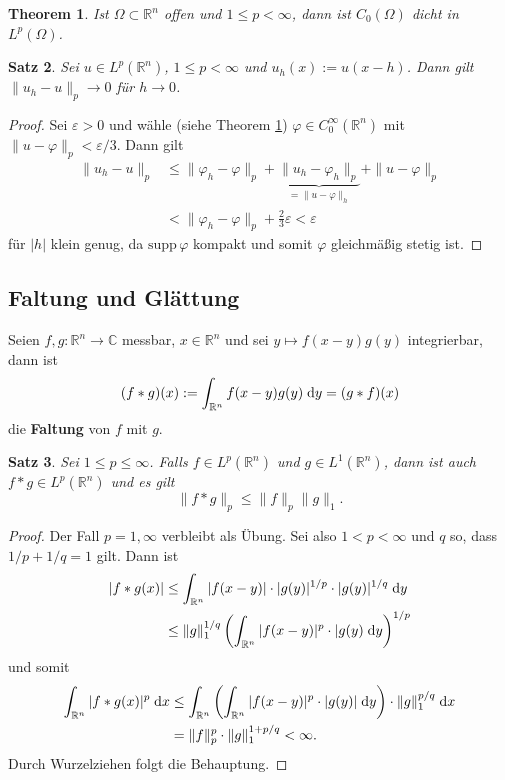 \documentclass[
paper=a4,
bibtotocnumbered,
liststotocnumbered,
tablecaptionabove,
pointlessnumbers,
twoside,
openright,
10pt
]
{report}
\newcommand{\supp}{\mathrm{supp}\,}
\let\phi\varphi
\let\epsilon\varepsilon
\newtheorem{thm}{Theorem}[chapter]
\newtheorem{satz}[thm]{Satz}
\theoremstyle{definition}
\numberwithin{equation}{chapter}
\begin{document}
\begin{thm}\label{thm1}
Ist $\Omega\subset\mathbb{R}^n$ offen und $1\leq p<\infty$, dann ist $C_0(\Omega)$ dicht in $L^p(\Omega)$.
\end{thm}

\begin{satz}\label{satz2}
Sei $u\in L^p(\mathbb{R}^n)$, $1\leq p<\infty$ und $u_h(x):= u(x-h)$. Dann gilt $\|u_h-u\|_p\rightarrow 0$ für $h\rightarrow 0$.
\end{satz}
\begin{proof}
Sei $\epsilon >0$ und wähle (siehe Theorem \ref{thm1}) $\phi\in C_0^\infty(\mathbb{R}^n)$ mit $\|u-\phi\|_p<\epsilon/3$. Dann gilt
\begin{align}
\|u_h-u\|_p &\leq \|\phi_h-\phi\|_p+ \underbrace{\|u_h-\phi_h\|_p}_{=\|u-\phi\|_h} +\|u-\phi\|_p \\
&< \|\phi_h-\phi\|_p +\frac{2}{3}\epsilon <\epsilon
\end{align}
für $|h|$ klein genug, da $\supp\phi$ kompakt und somit $\phi$ gleichmäßig stetig ist.
\end{proof}

\subsection*{Faltung und Glättung}
Seien $f,g:\mathbb{R}^n\rightarrow\mathbb{C}$ messbar, $x\in\mathbb{R}^n$ und sei $y\mapsto f(x-y)g(y)$ integrierbar, dann ist
\begin{equation}
(f\ast g)(x):= \int_{\mathbb{R}^n} f(x-y)g(y)\;\mathrm{d} y=(g\ast f)(x)
\end{equation}
die \textbf{Faltung} von $f$ mit $g$.

\begin{satz}\label{satz3}
Sei $1\leq p\leq \infty$. Falls $f\in L^p(\mathbb{R}^n)$ und $g\in L^1(\mathbb{R}^n)$, dann ist auch $f\ast g\in L^p(\mathbb{R}^n)$ und es gilt
\begin{equation}
\|f\ast g\|_p\leq \|f\|_p\|g\|_1.
\end{equation}
\end{satz}
\begin{proof}
Der Fall $p=1,\infty$ verbleibt als Übung. Sei also $1<p<\infty$ und $q$ so, dass $1/p+1/q=1$ gilt. Dann ist
\begin{align}
|f\ast g(x)| &\leq \int_{\mathbb{R}^n} |f(x-y)|\cdot |g(y)|^{1/p}\cdot |g(y)|^{1/q}\;\mathrm{d} y \\
&\leq \|g\|_1^{1/q}
\left(
\int_{\mathbb{R}^n} |f(x-y)|^p\cdot  |g(y)\;\mathrm{d} y
\right)^{1/p}
\end{align}
und somit
\begin{align}
\int_{\mathbb{R}^n}|f\ast g(x)|^p\;\mathrm{d} x 
&\leq \int_{\mathbb{R}^n} \left(\int_{\mathbb{R}^n} |f(x-y)|^p\cdot |g(y)|\;\mathrm{d} y\right)\cdot \|g\|_1^{p/q} \;\mathrm{d} x \\
&= \|f\|_p^p\cdot \|g\|_1^{1+p/q} <\infty.
\end{align}
Durch Wurzelziehen folgt die Behauptung.
\end{proof}
\end{document}
